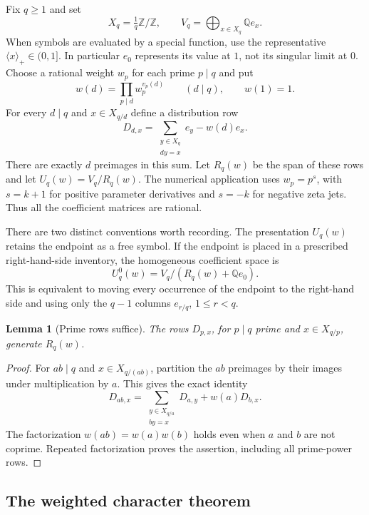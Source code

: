 \documentclass[11pt,a4paper]{article}
\newtheorem{lemma}[theorem]{Lemma}
\theoremstyle{definition}
\theoremstyle{remark}
\numberwithin{equation}{section}
\begin{document}
Fix $q\geq1$ and set
\[
 X_q=\tfrac1q\mathbb Z/\mathbb Z,
 \qquad V_q=\bigoplus_{x\in X_q}\mathbb Q e_x.
\]
When symbols are evaluated by a special function, use the representative
$\langle x\rangle_+\in(0,1]$.  In particular $e_0$ represents its value at
$1$, not its singular limit at $0$.  Choose a rational weight $w_p$ for each
prime $p\mid q$ and put
\[
 w(d)=\prod_{p\mid d}w_p^{v_p(d)}\qquad(d\mid q),
 \qquad w(1)=1.
\]
For every $d\mid q$ and $x\in X_{q/d}$ define a distribution row
\begin{equation}\label{rank:row}
 D_{d,x}=\sum_{\substack{y\in X_q\\dy=x}}e_y-w(d)e_x.
\end{equation}
There are exactly $d$ preimages in this sum.  Let $R_q(w)$ be the span of
these rows and let $U_q(w)=V_q/R_q(w)$.  The numerical application uses
$w_p=p^s$, with $s=k+1$ for positive parameter derivatives and $s=-k$ for
negative zeta jets.  Thus all the coefficient matrices are rational.

There are two distinct conventions worth recording.  The presentation
$U_q(w)$ retains the endpoint as a free symbol.  If the endpoint is placed
in a prescribed right-hand-side inventory, the homogeneous coefficient
space is
\begin{equation}\label{rank:endpoint}
 U_q^0(w)=V_q/(R_q(w)+\mathbb Q e_0).
\end{equation}
This is equivalent to moving every occurrence of the endpoint to the
right-hand side and using only the $q-1$ columns $e_{r/q}$,
$1\leq r<q$.

\begin{lemma}[Prime rows suffice]\label{rank:prime}
The rows $D_{p,x}$, for $p\mid q$ prime and $x\in X_{q/p}$, generate
$R_q(w)$.
\end{lemma}
\begin{proof}
For $ab\mid q$ and $x\in X_{q/(ab)}$, partition the $ab$ preimages by
their images under multiplication by $a$.  This gives the exact identity
\[
 D_{ab,x}=\sum_{\substack{y\in X_{q/a}\\by=x}}D_{a,y}
             +w(a)D_{b,x}.
\]
The factorization $w(ab)=w(a)w(b)$ holds even when $a$ and $b$ are not
coprime.  Repeated factorization proves the assertion, including all
prime-power rows.
\end{proof}

\subsection{The weighted character theorem}
\end{document}
